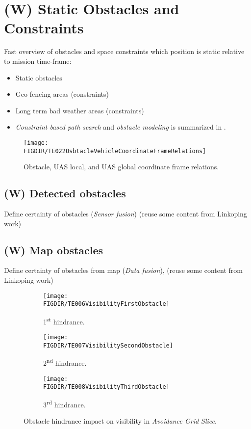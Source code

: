 \section{(W) Static Obstacles and Constraints}\label{s:staticObstacles}
    \noindent Fast overview of obstacles and space constraints which position is static relative to mission time-frame:
    \begin{itemize}
        \item Static obstacles
        \item Geo-fencing areas (constraints)
        \item Long term bad weather areas (constraints)
		\item \emph{Constraint based path search} and \emph{obstacle modeling} is summarized in \cite{hentenryck2009constraint}.
    \end{itemize}
    \begin{figure}[H]
        \centering
        \texttt{[image: \\FIGDIR/TE022OsbtacleVehicleCoordinateFrameRelations]} 
        \caption{Obstacle, UAS local, and UAS global coordinate frame relations.}
        \label{fig:coordinateFrameRelationsInFramework}
    \end{figure}
    
\subsection{(W) Detected obstacles}\label{s:detectedObstacles}
    \noindent Define certainty of obstacles (\emph{Sensor fusion}) (reuse some content from Linkoping work)

\subsection{(W) Map obstacles}\label{s:mapObstacles}
    \noindent Define certainty of obstacles from map (\emph{Data fusion}), (reuse some content from Linkoping work)
    \begin{figure}[H]
        \begin{subfigure}{0.32\textwidth}
            \texttt{[image: \\FIGDIR/TE006VisibilityFirstObstacle]} 
            \caption{1\textsuperscript{st} hindrance.}
            \label{fig:fistObstacleHindrance}
        \end{subfigure}
        \begin{subfigure}{0.32\textwidth}
            \texttt{[image: \\FIGDIR/TE007VisibilitySecondObstacle]} 
            \caption{2\textsuperscript{nd} hindrance.}
            \label{fig:secondObstacleHindrance}
        \end{subfigure}
        \begin{subfigure}{0.32\textwidth}
            \texttt{[image: \\FIGDIR/TE008VisibilityThirdObstacle]} 
            \caption{3\textsuperscript{rd} hindrance.}
            \label{fig:thirdObstacleHindrance}
        \end{subfigure}
        \caption{Obstacle hindrance impact on visibility in \emph{Avoidance Grid Slice}.}
        \label{fig:hindranceImpactOnVisibility}
    \end{figure}
    
